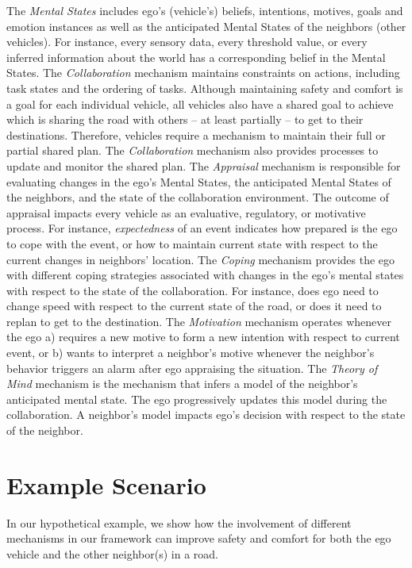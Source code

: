\documentclass[journal, 11pt]{IEEEtran}
\begin{document}
The \textit{Mental States} includes ego's (vehicle's) beliefs, intentions,
motives, goals and emotion instances as well as the anticipated Mental States of
the neighbors (other vehicles). For instance, every sensory data, every
threshold value, or every inferred information about the world has a
corresponding belief in the Mental States. The \textit{Collaboration} mechanism
maintains constraints on actions, including task states and the ordering of
tasks. Although maintaining safety and comfort is a goal for each individual
vehicle, all vehicles also have a shared goal to achieve which is sharing the
road with others -- at least partially -- to get to their destinations.
Therefore, vehicles require a mechanism to maintain their full or partial shared
plan. The \textit{Collaboration} mechanism also provides processes to update and
monitor the shared plan. The \textit{Appraisal} mechanism is responsible for
evaluating changes in the ego's Mental States, the anticipated Mental States of
the neighbors, and the state of the collaboration environment. The outcome of
appraisal impacts every vehicle as an evaluative, regulatory, or motivative
process. For instance, \textit{expectedness} of an event indicates how prepared
is the ego to cope with the event, or how to maintain current state with respect
to the current changes in neighbors' location. The \textit{Coping} mechanism
provides the ego with different coping strategies associated with changes in the
ego's mental states with respect to the state of the collaboration. For
instance, does ego need to change speed with respect to the current state of
the road, or does it need to replan to get to the destination. The
\textit{Motivation} mechanism operates whenever the ego a) requires a new
motive to form a new intention with respect to current event, or b) wants to
interpret a neighbor's motive whenever the neighbor's behavior triggers an
alarm after ego appraising the situation. The \textit{Theory of Mind} mechanism
is the mechanism that infers a model of the neighbor's anticipated mental state.
The ego progressively updates this model during the collaboration. A neighbor's
model impacts ego's decision with respect to the state of the neighbor.

\section{Example Scenario}
\label{sec:example-scenario}

In our hypothetical example, we show how the involvement of different mechanisms
in our framework can improve safety and comfort for both the ego vehicle and the
other neighbor(s) in a road.
\end{document}
